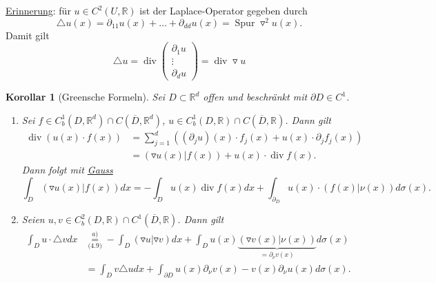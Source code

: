 \documentclass[a4paper]{scrreprt}
\newcommand{\R}{\mathbb{R}}
\newcommand{\overunderset}[3]{\overset{#1}{\underset{#3}{#2}}}
\newcommand{\jlabel}[1]{\label{j_#1}}
\newcommand{\jshortlink}[1]{\jhyperref{#1}{\text{#1}}}
\newcommand{\jhyperref}[2]{\hyperref[j_#1]{#2}}
\newcommand{\jlink}[1]{\jhyperref{#1}{#1}}
\newcommand{\Spur}{\mathop{\mathrm{{Spur}}}}
\renewcommand{\div}{\mathop{\mathrm{{div}}}}
\theoremstyle{plain}
\newtheorem{kor}[thm]{Korollar}
\theoremstyle{definition}
\begin{document}
{{{{\uline{Erinnerung}: für $u\in C^2(U,\R)$ ist der Laplace-Operator gegeben durch
\[
    \triangle u(x) = \partial_{11} u(x) + \dots + \partial_{dd} u(x) = \Spur \triangledown^2 u(x).
\]
Damit gilt
\begin{equation}
    \jlabel{(4.9)}
    \triangle u = \div \begin{pmatrix}
                           \partial_1 u\\
                           \vdots\\
                           \partial_d u
                       \end{pmatrix} = \div \triangledown u
\end{equation}


\begin{kor}[Greensche Formeln]
    \jlabel{Kor 4.19}
    \jlabel{Green}
    Sei $D\subset \R^d$ offen und beschränkt mit $\partial D\in C^1$.
    \begin{enumerate}
        \item 
            \jlabel{Kor 4.19.a)}
            Sei $f\in C_b^1(D,\R^d)\cap C(\overline{D}, \R^d)$, $u \in C_b^1(D,\R)\cap C(\overline{D},\R)$. Dann gilt
            \[
                \begin{split}
                    \div (u(x)\cdot f(x)) &= \sum_{j=1}^d \left((\partial_j u)(x)\cdot f_j(x) + u(x)\cdot \partial_j f_j(x) \right)\\
                                          &= \left(\triangledown u(x)|f(x) \right) + u(x)\cdot \div f(x).
                \end{split}
            \]
            Dann folgt mit \jlink{Gauss}
            \[
                \int_D (\triangledown u(x)|f(x)) dx = -\int_D u(x) \div f(x) dx + \int_{\partial_D} u(x)\cdot (f(x)|\nu(x))d\sigma(x).
            \]

        \item
            \jlabel{Kor 4.19.b)}
            Seien $u,v\in C_b^2(D,\R) \cap C^1(\overline{D},\R)$. Dann gilt
            \[
                \begin{split}
                    \int_D u\cdot\triangle v dx &\overunderset{a)}{=}{\jshortlink{(4.9)}} -\int_D (\triangledown u | \triangledown v) dx + \int_D u(x)\underbrace{(\triangledown v(x)| \nu(x))}_{=\partial_\nu v(x)} d\sigma(x)\\
                    &=\int_D v \triangle u dx + \int_{\partial D} u(x)\partial_\nu v(x) - v(x)\partial_\nu u(x) d\sigma(x).
                \end{split}
            \]
    \end{enumerate}
\end{kor}

}}}}
\end{document}
